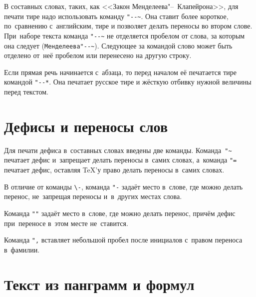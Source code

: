 В составных словах, таких, как <<Закон Менделеева"--~Клапейрона>>, для печати тире надо использовать команду \verb|"--~|. Она ставит более короткое, по~сравнению с~английским, тире и позволяет делать переносы во втором слове. При~наборе текста команда \verb|"--~| не отделяется пробелом от слова, за которым она следует (\verb|Менделеева"--~|). Следующее за командой слово может быть  отделено от~неё пробелом или перенесено на другую строку.

Если прямая речь начинается с~абзаца, то перед началом её печатается тире командой
\verb|"--*|. Она печатает русское тире и жёсткую отбивку нужной величины перед текстом.

\section{Дефисы и переносы слов}
Для печати дефиса в~составных словах введены две команды. Команда~\verb|"~| печатает дефис и~запрещает делать переносы в~самих словах, а~команда \verb|"=| печатает дефис, оставляя \TeX ’у право делать переносы в~самих словах.

В отличие от команды \verb|\-|, команда \verb|"-| задаёт место в~слове, где можно делать перенос, не~запрещая переносы и~в~других местах слова.

Команда \verb|""| задаёт место в~слове, где можно делать перенос, причём дефис при~переносе в~этом месте не~ставится.

Команда \verb|",| вставляет небольшой пробел после инициалов с~правом переноса в~фамилии.

\section{Текст из панграмм и формул}


